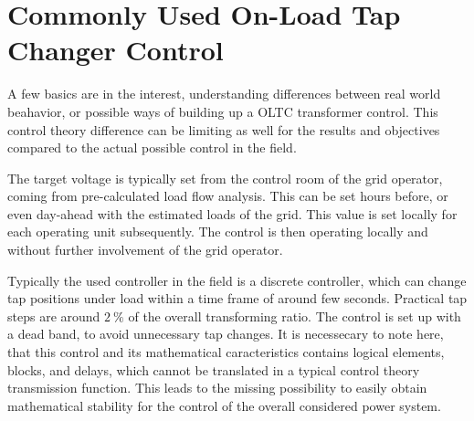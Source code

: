 
\section{Commonly Used On-Load Tap Changer Control}

A few basics are in the interest, understanding differences between real world beahavior, or possible ways of building up a \acs{OLTC} transformer control. This control theory difference can be limiting as well for the results and objectives compared to the actual possible control in the field.

The target voltage is typically set from the control room of the grid operator, coming from pre-calculated load flow analysis. This can be set hours before, or even day-ahead with the estimated loads of the grid. This value is set locally for each operating unit subsequently. The control is then operating locally and without further involvement of the grid operator. \quelle

Typically the used controller in the field is a discrete controller, which can change tap positions under load within a time frame of around few seconds. Practical tap steps are around $2~\mathrm{\%}$ of the overall transforming ratio. The control is set up with a dead band, to avoid unnecessary tap changes. It is necessecary to note here, that this control and its mathematical caracteristics contains logical elements, blocks, and delays, which cannot be translated in a typical control theory transmission function. This leads to the missing possibility to easily obtain mathematical stability for the control of the overall considered power system. \quelle


